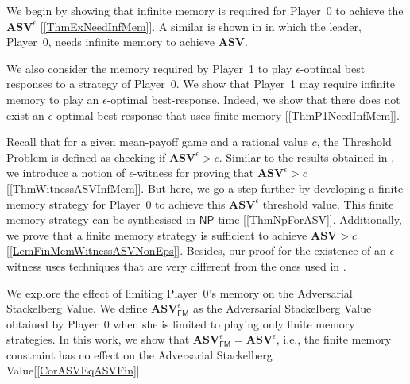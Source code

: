 
We begin by showing that infinite memory is required for Player~0 to achieve the $\mathbf{ASV}^{\epsilon}$ [\cref{ThmExNeedInfMem}]. A similar is shown in \cite{FGR20} in which the leader, Player~0, needs infinite memory to achieve $\mathbf{ASV}$.

We also consider the memory required by Player~1 to play $\epsilon$-optimal best responses to a strategy of Player~0. We show that Player~1 may require infinite memory to play an $\epsilon$-optimal best-response.  Indeed, we show that there does not exist an $\epsilon$-optimal best response that uses finite memory [\cref{ThmP1NeedInfMem}].

Recall that for a given mean-payoff game and a rational value $c$, the Threshold Problem is defined as checking if $\mathbf{ASV}^{\epsilon} > c$. Similar to the results obtained in \cite{FGR20}, we introduce a notion of $\epsilon$-witness for proving that $\mathbf{ASV}^{\epsilon} > c$ [\cref{ThmWitnessASVInfMem}]. But here, we go a step further by developing a finite memory strategy for Player~0 to achieve this $\mathbf{ASV}^{\epsilon}$ threshold value. This finite memory strategy can be synthesised in $\mathsf{NP}$-time [\cref{ThmNpForASV}]. Additionally, we prove that a finite memory strategy is sufficient to achieve $\mathbf{ASV} > c$ [\cref{LemFinMemWitnessASVNonEps}]. Besides, our proof for the existence of an $\epsilon$-witness uses techniques that are very different from the ones used in \cite{FGR20}.

We explore the effect of limiting Player~0's memory on the Adversarial Stackelberg Value. We define $\mathbf{ASV}^{\epsilon}_{\mathsf{FM}}$ as the Adversarial Stackelberg Value obtained by Player~0 when she is limited to playing only finite memory strategies. In this work, we show that $\mathbf{ASV}^{\epsilon}_{\mathsf{FM}} = \mathbf{ASV}^{\epsilon}$, i.e., the finite memory constraint has no effect on the Adversarial Stackelberg Value[\cref{CorASVEqASVFin}].

